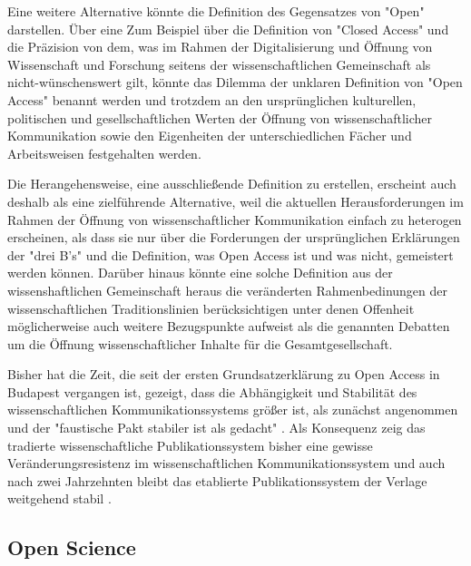 Eine weitere Alternative könnte die Definition des Gegensatzes von "Open" darstellen. Über eine Zum Beispiel über die Definition von "Closed Access" und die Präzision von dem, was im Rahmen der Digitalisierung und Öffnung von Wissenschaft und Forschung seitens der wissenschaftlichen Gemeinschaft als nicht-wünschenswert gilt, könnte das Dilemma der unklaren Definition von "Open Access" benannt werden und trotzdem an den ursprünglichen kulturellen, politischen und gesellschaftlichen Werten der Öffnung von wissenschaftlicher Kommunikation sowie den Eigenheiten der unterschiedlichen Fächer und Arbeitsweisen festgehalten werden.

Die Herangehensweise, eine ausschließende Definition zu erstellen, erscheint auch deshalb als eine zielführende Alternative, weil die aktuellen Herausforderungen im Rahmen der Öffnung von wissenschaftlicher Kommunikation einfach zu heterogen erscheinen, als dass sie nur über die Forderungen der ursprünglichen Erklärungen der "drei B's" und die Definition, was Open Access ist und was nicht, gemeistert werden können. Darüber hinaus könnte eine solche Definition aus der wissenshaftlichen Gemeinschaft heraus die veränderten Rahmenbedinungen der wissenschaftlichen Traditionslinien berücksichtigen unter denen Offenheit möglicherweise auch weitere Bezugspunkte aufweist als die genannten Debatten um die Öffnung wissenschaftlicher Inhalte für die Gesamtgesellschaft.

Bisher hat die Zeit, die seit der ersten Grundsatzerklärung zu Open Access in Budapest vergangen ist, gezeigt, dass die Abhängigkeit und Stabilität des wissenschaftlichen Kommunikationssystems größer ist, als zunächst angenommen und der "faustische Pakt stabiler ist als gedacht" \cite{Hagner_2015}. Als Konsequenz zeig das tradierte wissenschaftliche Publikationssystem bisher eine gewisse Veränderungsresistenz im wissenschaftlichen Kommunikationssystem und auch nach zwei Jahrzehnten bleibt das etablierte Publikationssystem der Verlage weitgehend stabil \cite{Hanekop_2014}.

\subsection{Open Science}

